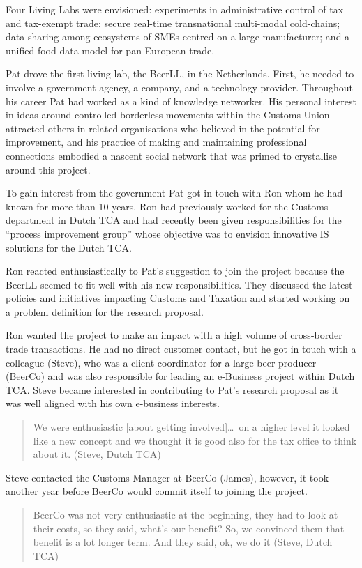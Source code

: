 \documentclass[graybox]{styles/svmult}
\begin{document}
Four Living Labs were envisioned: experiments in administrative control of tax and tax-exempt trade; secure real-time transnational multi-modal cold-chains; data sharing among ecosystems of SMEs centred on a large manufacturer; and a unified food data model for pan-European trade.

Pat drove the first living lab, the BeerLL, in the Netherlands. 
First, he needed to involve a government agency, a company, and a technology provider.
Throughout his career Pat had worked as a kind of knowledge networker.
His personal interest in ideas around controlled borderless movements within the Customs Union attracted others in related organisations who believed in the potential for improvement, and his practice of making and maintaining professional connections embodied a nascent social network that was primed to crystallise around this project.

To gain interest from the government Pat got in touch with Ron whom he had known for more than 10 years. 
Ron had previously worked for the Customs department in Dutch TCA and had recently been given responsibilities for the \enquote{process improvement group} whose objective was to envision innovative IS solutions for the Dutch TCA. 

Ron reacted enthusiastically to Pat's suggestion to join the project because the BeerLL seemed to fit well with his new responsibilities. They discussed the latest policies and initiatives impacting Customs and Taxation and started working on a problem definition for the research proposal. 

Ron wanted the project to make an impact with a high volume of cross-border trade transactions. He had no direct customer contact, but he got in touch with a colleague (Steve), who was a client coordinator for a large beer producer (BeerCo) and was also responsible for leading an e-Business project within Dutch TCA. Steve became interested in contributing to Pat's research proposal as it was well aligned with his own e-business interests.

\blockquote{We were enthusiastic [about getting involved]\dots~on a higher level it looked like a new concept and we thought it is good also for the tax office to think about it. (Steve, Dutch TCA)}

Steve contacted the Customs Manager at BeerCo (James), however, it took another year before BeerCo would commit itself to joining the project.

\blockquote{BeerCo was not very enthusiastic at the beginning, they had to look at their costs, so they said, what's our benefit? So, we convinced them that benefit is a lot longer term. And they said, ok, we do it (Steve, Dutch TCA)}
\end{document}
